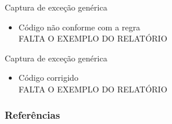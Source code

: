 \documentclass[brazilian]{beamer}
\begin{document}
\begin{frame}{Captura de exceção genérica}
    \begin{itemize}
        \item Código não conforme com a regra
        \\ \color{red} \huge{FALTA O EXEMPLO DO RELATÓRIO}
    \end{itemize}
\end{frame}

\begin{frame}{Captura de exceção genérica}
    \begin{itemize}
        \item Código corrigido
        \\ \color{red} \huge{FALTA O EXEMPLO DO RELATÓRIO}
    \end{itemize}
\end{frame}

\begin{frame}[allowframebreaks]
    \frametitle{Referências}
    
    
\end{frame}
\end{document}

